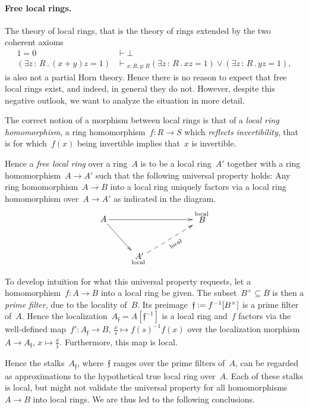 \documentclass{ws-rv9x6}
\newcommand{\fff}{\mathfrak{f}}
\newcommand{\defeq}{\vcentcolon=}
\renewcommand{\_}{\mathpunct{.}}
\newcommand{\?}{\,{:}\,}
\newcommand{\seq}[1]{\mathrel{\vdash\!\!\!_{#1}}}
\begin{document}
\paragraph{Free local rings.} The theory of local rings, that is the theory of
rings extended by the two coherent axioms
\begin{align*}
  1 = 0 &\vdash \bot \\
  (\exists z\?R\_ (x+y)z = 1) &\seq{x:R,y:R} (\exists z\?R\_ xz = 1) \vee
  (\exists z\?R\_ yz = 1),
\end{align*}
is also not a partial Horn theory. Hence there is no reason to expect that free
local rings exist, and indeed, in general they do not. However, despite this
negative outlook, we want to analyze the situation in more detail.

The correct notion of a morphism between local rings is that of a \emph{local
ring homomorphism}, a ring homomorphism~$f : R \to S$ which \emph{reflects
invertibility}, that is for which~$f(x)$ being invertible implies that~$x$ is
invertible.

Hence a \emph{free local ring} over a ring~$A$ is to be a local ring~$A'$
together with a ring homomorphism~$A \to A'$ such that the following universal
property holds: Any ring homomorphism~$A \to B$ into a local ring uniquely
factors via a local ring homomorphism over~$A \to A'$ as indicated in the diagram.
\[ \xymatrix{
  A \ar[rd] \ar[rrr] &&& {\substack{\text{local}\\\text{\normalsize$\!\!\!B$}\\\phantom{\text{local}}}} \\
  & {\substack{\text{\normalsize$\!\!A'$}\\\text{local}}} \ar@{-->}_[@!31]{\text{local}}[rru]
} \]

To develop intuition for what this universal property requests, let a
homomorphism~$f : A \to B$ into a local ring be given. The subset~$B^\times
\subseteq B$ is then a \emph{prime filter}, due to the locality of~$B$. Its
preimage~$\fff \defeq f^{-1}[B^\times]$ is a prime filter of~$A$. Hence the
localization~$A_\fff = A[\fff^{-1}]$ is a local ring and~$f$ factors via the
well-defined map~$f' : A_\fff \to B,\,\frac{x}{s} \mapsto f(s)^{-1}f(x)$ over
the localization morphism~$A \to A_\fff,\,x \mapsto \frac{x}{1}$. Furthermore,
this map is local.

Hence the stalks~$A_\fff$, where~$\fff$ ranges over the prime filters of~$A$,
can be regarded as approximations to the hypothetical true local ring over~$A$.
Each of these stalks is local, but might not validate the universal property
for all homomorphisms~$A \to B$ into local rings. We are thus led to the
following conclusions.
\end{document}
